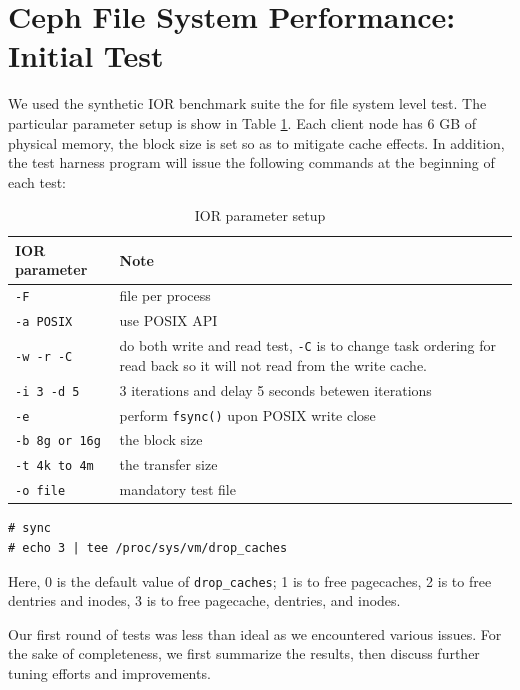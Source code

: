 \documentclass{article}
\begin{document}
\section{Ceph File System Performance: Initial Test}

We used the synthetic IOR benchmark suite the for file system level test. The particular
parameter setup is show in Table \ref{tbl:ior}. Each client node has 6 GB of
physical memory, the block size is set so as to mitigate cache effects. In
addition, the test harness program will issue the following commands at the
beginning of each test:




\begin{table}[tb]
\centering
\begin{tabular}{p{1.5in} | p{3in}}
    \toprule
    IOR parameter & Note \\ \midrule
    \verb!-F! & file per process \\ \midrule
    \verb!-a POSIX! & use POSIX API \\ \midrule
    \verb!-w -r -C! & do both write and read test, \verb!-C! is to change task
        ordering for read back so it will not read from the write cache. \\ \midrule
    \verb!-i 3 -d 5! & 3 iterations and delay 5 seconds betewen iterations \\
    \midrule  
    \verb!-e! & perform \verb!fsync()! upon POSIX write close \\ \midrule
    \verb!-b 8g or 16g! & the block size \\ \midrule
    \verb!-t 4k to 4m! & the transfer size \\ \midrule
    \verb!-o file! & mandatory test file  \\    
    \bottomrule
\end{tabular}
\caption{IOR parameter setup}
\label{tbl:ior}
\end{table}


\begin{Verbatim}
# sync
# echo 3 | tee /proc/sys/vm/drop_caches
\end{Verbatim}


Here, 0 is the default value of \verb!drop_caches!; 1 is to free pagecaches, 2
is to free dentries and inodes, 3 is to free pagecache, dentries, and inodes.


Our first round of tests was less than ideal as we encountered various issues. For
the sake of completeness, we first summarize the results, then discuss
further tuning efforts and improvements.
\end{document}
